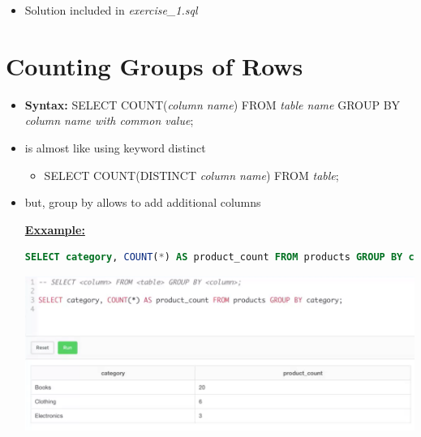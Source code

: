 \documentclass[12pt]{article}
\begin{document}
\begin{itemize}
    \item Solution included in \textit{exercise\_1.sql}
\end{itemize}

\bigskip

\section{Counting Groups of Rows}

\bigskip

\begin{itemize}
    \item \textbf{Syntax:} SELECT COUNT(\textit{column name}) FROM \textit{table name} GROUP BY \textit{column name with common value};
    \item is almost like using keyword distinct
    \begin{itemize}
        \item SELECT COUNT(DISTINCT \textit{column name}) FROM \textit{table};
    \end{itemize}
    \item but, group by allows to add additional columns

    \bigskip

    \underline{\textbf{Exxample:}}

    \bigskip

    \begin{lstlisting}[language=SQL]
    SELECT category, COUNT(*) AS product_count FROM products GROUP BY category;
    \end{lstlisting}

    \bigskip

    \begin{center}
    \includegraphics[width=\linewidth]{images/part_3_notes_1.png}
    \end{center}
\end{itemize}

\bigskip
\end{document}
